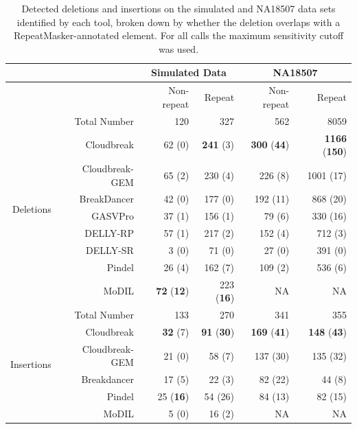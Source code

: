 \begin{table}
\begin{center}
\begin{tabular}{r|r|rr|rr}
  \cline{2-6}
 & & \multicolumn{2}{c}{Simulated Data} & \multicolumn{2}{c}{NA18507} \\
\hline
 & & Non-repeat & Repeat  & Non-repeat & Repeat \\ 
\multirow{9}{*}{\begin{sideways}Deletions\end{sideways}} & Total Number & 120 & 327 & 562 & 8059 \\ 
  \cline{2-6}
&  Cloudbreak  & 62 (0) & \textbf{241} (3) & \textbf{300} (\textbf{44}) & \textbf{1166} (\textbf{150}) \\ 
&  Cloudbreak-GEM  & 65 (2) & 230 (4) & 226 (8) & 1001 (17) \\ 
&  BreakDancer & 42 (0) & 177 (0) & 192 (11) & 868 (20) \\
&  GASVPro     & 37 (1) & 156 (1) & 79 (6) & 330 (16) \\
&  DELLY-RP       & 57 (1) & 217 (2) & 152 (4) & 712 (3) \\
&  DELLY-SR       & 3 (0) & 71 (0) & 27 (0) & 391 (0) \\
&  Pindel      & 26 (4) & 162 (7) & 109 (2) & 536 (6) \\ 
&  MoDIL      & \textbf{72} (\textbf{12}) & 223 (\textbf{16}) & NA & NA \\ 
   \hline
\multirow{6}{*}{\begin{sideways}Insertions\end{sideways}} & Total Number & 133 & 270 & 341 & 355 \\ 
\cline{2-6}
&  Cloudbreak  & \textbf{32} (7) & \textbf{91} (\textbf{30}) & \textbf{169} (\textbf{41}) & \textbf{148} (\textbf{43}) \\ 
&  Cloudbreak-GEM  & 21 (0) & 58 (7) & 137 (30) & 135 (32) \\ 
&  Breakdancer & 17 (5) & 22 (3) & 82 (22) & 44 (8) \\
&  Pindel      & 25 (\textbf{16}) & 54 (26) & 84 (13) & 82 (15) \\ 
&  MoDIL      & 5 (0) & 16 (2) & NA & NA \\ 
\hline
\end{tabular}
\end{center}
\caption[Detected deletions and insertions on the simulated and NA18507 data sets that overlap with repetitive elements.]{Detected deletions and insertions on the simulated and NA18507 data sets identified by each tool, broken down by whether the deletion overlaps with a RepeatMasker-annotated element. For all calls the maximum sensitivity cutoff was used.}
\label{predsByRepmask}
\end{table}

